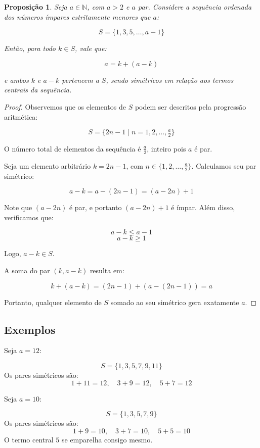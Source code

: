 \documentclass[a4paper,11pt]{article}
\newtheorem{proposition}[theorem]{Proposição}
\theoremstyle{definition}
\theoremstyle{remark}
\begin{document}
\begin{otherlanguage}{brazil}
	\begin{proposition}
		Seja $a \in \mathbb{N}$, com $a > 2$ e $a$ par. Considere a sequência ordenada dos números ímpares estritamente menores que $a$:
		
		\[
		S = \{1, 3, 5, \dotsc, a - 1\}
		\]
		
		Então, para todo $k \in S$, vale que:
		
		\[
		a = k + (a - k)
		\]
		
		e ambos $k$ e $a - k$ pertencem a $S$, sendo simétricos em relação aos termos centrais da sequência.
	\end{proposition}
	
	
	\begin{proof}
		Observemos que os elementos de $S$ podem ser descritos pela progressão aritmética:
		
		\[
		S = \{2n - 1 \mid n = 1, 2, \dotsc, \tfrac{a}{2} \}
		\]
		
		O número total de elementos da sequência é $\tfrac{a}{2}$, inteiro pois $a$ é par.
		
		Seja um elemento arbitrário $k = 2n - 1$, com $n \in \{1, 2, \dotsc, \tfrac{a}{2}\}$. Calculamos seu par simétrico:
		
		\[
		a - k = a - (2n - 1) = (a - 2n) + 1
		\]
		
		Note que $(a - 2n)$ é par, e portanto $(a - 2n) + 1$ é ímpar. Além disso, verificamos que:
		
		\[
		a - k \leq a - 1
		\]
		\[
		a - k \geq 1
		\]
		
		Logo, $a - k \in S$.
		
		A soma do par $(k, a - k)$ resulta em:
		
		\[
		k + (a - k) = (2n - 1) + (a - (2n - 1)) = a
		\]
		
		Portanto, qualquer elemento de $S$ somado ao seu simétrico gera exatamente $a$.
		
	\end{proof}
	
	\subsection{Exemplos}
	
	Seja $a = 12$:
	
	\[
	S = \{1, 3, 5, 7, 9, 11\}
	\]
	Os pares simétricos são:
	\[
	1 + 11 = 12, \quad 3 + 9 = 12, \quad 5 + 7 = 12
	\]
	
	Seja $a = 10$:
	
	\[
	S = \{1, 3, 5, 7, 9\}
	\]
	Os pares simétricos são:
	\[
	1 + 9 = 10, \quad 3 + 7 = 10, \quad 5 + 5 = 10
	\]
	O termo central $5$ se emparelha consigo mesmo.
	

\end{otherlanguage}
\end{document}
